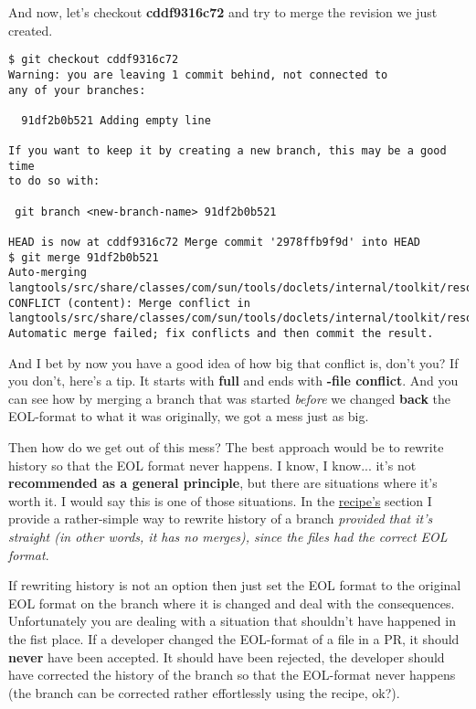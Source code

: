 And now, let's checkout {\bf cddf9316c72} and try to merge the revision we just created.

\begin{lstlisting}[style=console_style,
	basicstyle=\small,
	caption={\bf example 17} - current history]
$ git checkout cddf9316c72
Warning: you are leaving 1 commit behind, not connected to
any of your branches:

  91df2b0b521 Adding empty line

If you want to keep it by creating a new branch, this may be a good time
to do so with:

 git branch <new-branch-name> 91df2b0b521

HEAD is now at cddf9316c72 Merge commit '2978ffb9f9d' into HEAD
$ git merge 91df2b0b521
Auto-merging langtools/src/share/classes/com/sun/tools/doclets/internal/toolkit/resources/doclet.xml
CONFLICT (content): Merge conflict in langtools/src/share/classes/com/sun/tools/doclets/internal/toolkit/resources/doclet.xml
Automatic merge failed; fix conflicts and then commit the result.
\end{lstlisting}

And I bet by now you have a good idea of how big that conflict is, don't you? If you don't, here's a tip. It starts with
{\bf full} and ends with {\bf -file conflict}. And you can see how by merging a branch that was started {\it before} we
changed {\bf back} the EOL-format to what it was originally, we got a mess just as big.

Then how do we get out of this mess? The best approach would be to rewrite history so that the EOL format never happens.
I know, I know... it's not {\bf recommended as a general principle}, but there are situations where it's worth it. I would
say this is one of those situations. In the \hyperref[recipes]{recipe's} section I provide a rather-simple way to rewrite history
of a branch {\it provided that it's straight (in other words, it has no merges), since the files had the correct EOL format}.

If rewriting history is not an option then just set the EOL format to the original EOL format on the branch where it is changed
and deal with the consequences. Unfortunately you are dealing with a situation that shouldn't have happened in the fist place.
If a developer changed the EOL-format of a file in a PR, it should {\bf never} have been accepted. It should have been rejected,
the developer should have corrected the history of the branch so that the EOL-format never happens (the branch can be corrected
rather effortlessly using the recipe, ok?).

